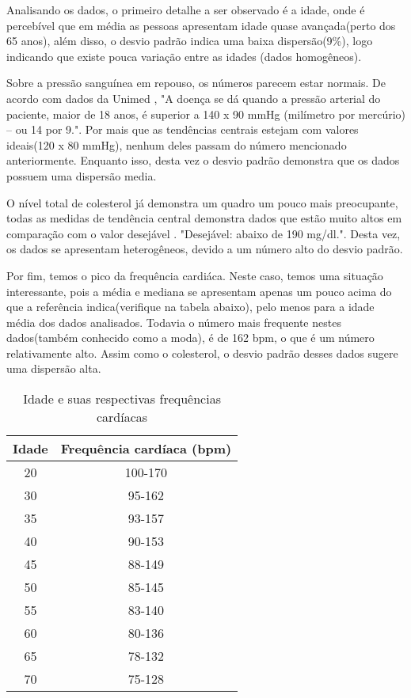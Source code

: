     Analisando os dados, o primeiro detalhe a ser observado é a idade, onde é percebível que em média
    as pessoas apresentam idade quase avançada(perto dos 65 anos), além disso, o desvio padrão indica 
    uma baixa dispersão(9\%), logo indicando que existe pouca variação entre as idades 
    (dados homogêneos).

    Sobre a pressão sanguínea em repouso, os números parecem estar normais. De acordo com dados da Unimed
    \cite{hipertensao}, "A doença se dá quando a pressão arterial do paciente, maior de 18 anos, é superior
    a 140 x 90 mmHg (milímetro por mercúrio) – ou 14 por 9.". Por mais que as tendências centrais estejam com  
    valores ideais(120 x 80 mmHg), nenhum deles passam do número mencionado anteriormente. Enquanto isso, desta vez o desvio padrão demonstra 
    que os dados possuem uma dispersão media.

    O nível total de colesterol já demonstra um quadro um pouco mais preocupante, todas as medidas 
    de tendência central demonstra dados que estão muito altos em comparação com o valor desejável \cite{colesterol}.
    "Desejável: abaixo de 190 mg/dl.". Desta vez, os dados se apresentam heterogêneos, devido a um número
    alto do desvio padrão.

    Por fim, temos o pico da frequência cardiáca. Neste caso, temos uma situação interessante, pois 
    a média e mediana se apresentam apenas um pouco acima do que a referência indica(verifique na tabela abaixo), pelo 
    menos para a idade média dos dados analisados. Todavia o número mais frequente nestes dados(também conhecido como a moda),
    é de 162 bpm, o que é um número relativamente alto. Assim como o colesterol, o desvio padrão desses dados sugere uma dispersão alta.

    \begin{table}[htb]
      \caption{Idade e suas respectivas frequências cardíacas}
      \centering
        \begin{tabular}{ |c|c|  }
          \hline
          Idade & Frequência cardíaca (bpm) \\
          \hline
          20 & 100-170  \\
          \hline
          30 & 95-162 \\
          \hline
          35 & 93-157 \\
          \hline
          40 & 90-153  \\
          \hline
          45 & 88-149 \\
          \hline
          50 & 85-145  \\
          \hline
          55 & 83-140  \\
          \hline
          60 & 80-136  \\
          \hline
          65 & 78-132  \\
          \hline
          70 & 75-128  \\
          \hline
        \end{tabular}
    \end{table}

    \nocite{frequenciacardiaca}
    \nocite{sobremedidascentrais}

